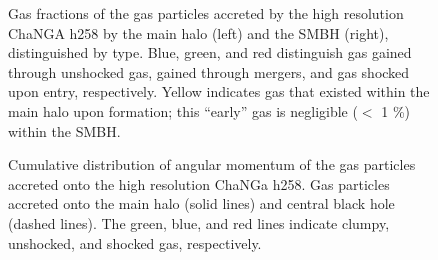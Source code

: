 \documentclass[12pt,headA,chapB]{fiskthesis}
\begin{document}
\begin{figure}[h]
\centerline{}
\caption[ChaNGa h258 Galaxy and SMBH Gas Fractions at z=0]{Gas fractions of the gas particles accreted by the high resolution ChaNGA h258 by the main halo (left) and the SMBH (right), distinguished by type. Blue, green, and red distinguish gas gained through unshocked gas, gained through mergers, and gas shocked upon entry, respectively. Yellow indicates gas that existed within the main halo upon formation; this ``early'' gas is negligible ($<$ 1 \%) within the SMBH.}
\label{hrh258stackfrac} 
\end{figure}

\begin{figure}[h]
\centerline{}
\caption[ChaNGa h258 Cumulative Angular Momentum Distribution]{ Cumulative distribution of angular momentum of the gas particles accreted onto the high resolution ChaNGa h258.  Gas particles accreted onto the main halo (solid lines) and central black hole (dashed lines). The green, blue, and red lines indicate clumpy, unshocked, and shocked gas, respectively.}
\label{hrh258angmom} 
\end{figure}
\end{document}
